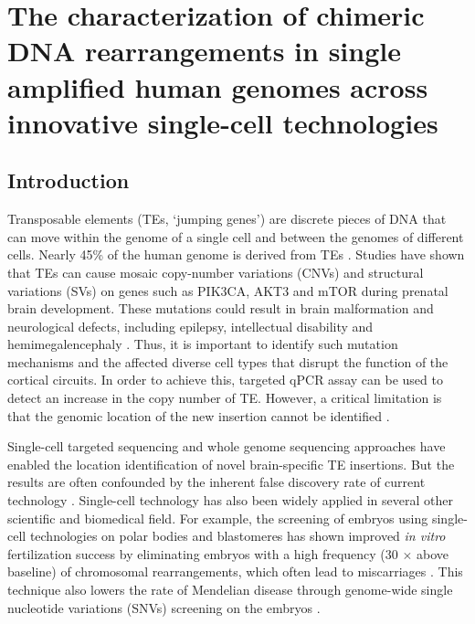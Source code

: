 \chapter{The characterization of chimeric DNA rearrangements in single amplified human genomes across innovative single-cell technologies}
\section{Introduction}
Transposable elements (TEs, `jumping genes') are discrete pieces of DNA that can move within the genome of a single cell and between the genomes of different cells. Nearly 45\% of the human genome is derived from TEs \cite{Perrat:2013cr,Cordaux:2009bb}. Studies have shown that TEs can cause mosaic copy-number variations (CNVs) and structural variations (SVs) on genes such as PIK3CA, AKT3 and mTOR during prenatal brain development. These mutations could result in brain malformation and neurological defects, including epilepsy, intellectual disability and hemimegalencephaly \cite{Lee:2014jp,Poduri:2013jp}. Thus, it is important to identify such mutation mechanisms and the affected diverse cell types that disrupt the function of the cortical circuits. In order to achieve this, targeted qPCR assay can be used to detect an increase in the copy number of TE. However, a critical limitation is that the genomic location of the new insertion cannot be identified \cite{Erwin:2014ir}. 

Single-cell targeted sequencing and whole genome sequencing approaches have enabled the location identification of novel brain-specific TE insertions. But the results are often confounded by the inherent false discovery rate of current technology \cite{Erwin:2014ir}. Single-cell technology has also been widely applied in several other scientific and biomedical field. For example, the screening of embryos using single-cell technologies on polar bodies and blastomeres has shown improved \textit{in vitro} fertilization success by eliminating embryos with a high frequency (30 $\times$ above baseline) of chromosomal rearrangements, which often lead to miscarriages \cite{Vanneste:2011dl}. This technique also lowers the rate of Mendelian disease through genome-wide single nucleotide variations (SNVs) screening on the embryos \cite{Hou:2013ub, Kuliev:2011jy}. 

